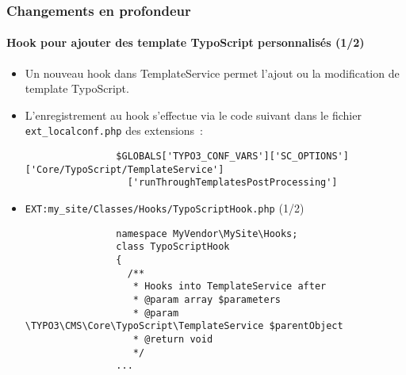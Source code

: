 \begin{frame}[fragile]
	\frametitle{Changements en profondeur}
	\framesubtitle{Hook pour ajouter des template TypoScript personnalisés (1/2)}

	\lstset{basicstyle=\tiny\ttfamily}

	\begin{itemize}
		\item Un nouveau hook dans TemplateService permet l'ajout ou la modification de template
			TypoScript.

		\item L'enregistrement au hook s'effectue via le code suivant dans le fichier
			\texttt{ext\_localconf.php} des extensions~:

			\begin{lstlisting}
				$GLOBALS['TYPO3_CONF_VARS']['SC_OPTIONS']['Core/TypoScript/TemplateService']
				  ['runThroughTemplatesPostProcessing']
			\end{lstlisting}

		\item \texttt{EXT:my\_site/Classes/Hooks/TypoScriptHook.php} (1/2)

			\begin{lstlisting}
				namespace MyVendor\MySite\Hooks;
				class TypoScriptHook
				{
				  /**
				   * Hooks into TemplateService after
				   * @param array $parameters
				   * @param \TYPO3\CMS\Core\TypoScript\TemplateService $parentObject
				   * @return void
				   */
				...
			\end{lstlisting}

	\end{itemize}

\end{frame}



